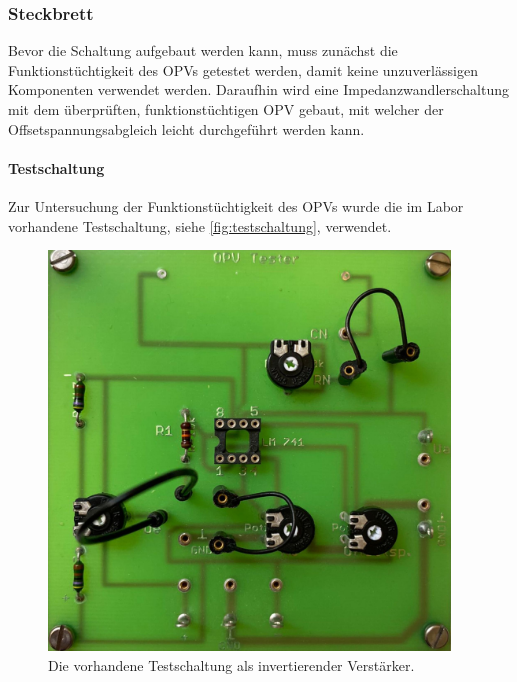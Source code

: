 \documentclass[12pt,english,ngerman]{scrartcl}
\begin{document}
\subsubsection{Steckbrett} \label{sec:elektrometer_steckbrett}
Bevor die Schaltung aufgebaut werden kann, muss zunächst die
Funktionstüchtigkeit des OPVs getestet werden, damit keine unzuverlässigen
Komponenten verwendet werden. Daraufhin wird eine Impedanzwandlerschaltung mit
dem überprüften, funktionstüchtigen OPV gebaut, mit welcher der
Offsetspannungsabgleich leicht durchgeführt werden kann.


\paragraph{Testschaltung}
Zur Untersuchung der Funktionstüchtigkeit des OPVs wurde die im Labor vorhandene
Testschaltung, siehe \autoref{fig:testschaltung}, verwendet. 

\begin{figure}[H]
  \centering
    \includegraphics[width=0.95\textwidth]{./figures/testschaltung.jpeg}
  \caption{Die vorhandene Testschaltung als invertierender Verstärker.}
  \label{fig:testschaltung}
\end{figure}
\end{document}
